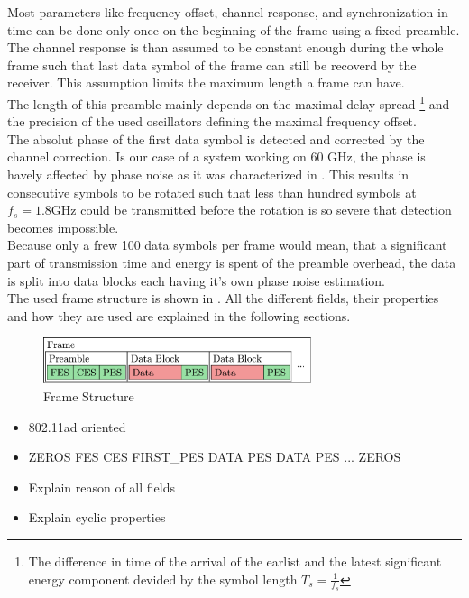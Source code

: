 Most parameters like frequency offset, channel response, and
synchronization in time can be done only once on the beginning of the
frame using a fixed preamble.
The channel response is than assumed to be constant enough during
the whole frame such that last data symbol of the frame can still be
recoverd by the receiver. This assumption limits the maximum length a frame
can have. \\

The length of this preamble mainly depends on the maximal delay spread
\footnote{The difference in time of the arrival of the earlist and the
  latest significant energy component devided by the symbol length
  $T_s = \frac{1}{f_s}$} and the precision of the used oscillators defining
the maximal frequency offset. \\

The absolut phase of the first data symbol is detected and corrected by the
channel correction. Is our case of a system working on 60 GHz, the
phase is havely affected by phase noise as it was characterized in
. This results in consecutive symbols to be
rotated such that less than hundred symbols at $f_s = 1.8 \text{GHz}$
could be transmitted before the rotation is so severe that detection
becomes impossible. \\

Because only a frew 100 data symbols per frame would mean,
that a significant part of transmission time and energy is spent
of the preamble overhead, the data is split into data blocks each having
it's own phase noise estimation. \\

The used frame structure is shown in .
All the different fields, their properties and how they are used
are explained in the following sections. \\

\begin{figure}[ht]
  \centering
  \includegraphics[width=0.7\textwidth]{figures/frame_struct}
  \caption{Frame Structure}
  \label{fig:sys_frame_struct}
\end{figure}

\begin{itemize}
\item 802.11ad oriented
\item ZEROS FES CES FIRST\_PES DATA PES DATA PES ... ZEROS
\item Explain reason of all fields
\item Explain cyclic properties
\end{itemize}

